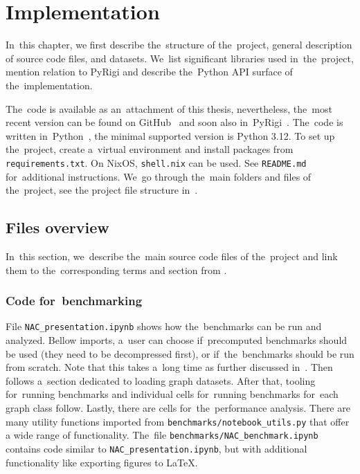 
\chapter{Implementation}%
\label{chapter:impl}

\begin{chapterabstract}

	In~this chapter,
	we first describe the~structure of the~project,
	general description of source code files, and datasets.
	We~list significant libraries used in~the~project,
	mention relation to PyRigi and
	describe the~Python API surface of the~implementation.

\end{chapterabstract}

The~code is available as an~attachment of this thesis,
nevertheless, the~most recent version can be found on GitHub~\cite{my_code}
and soon also in~PyRigi~\cite{pyrigi}.
%
The~code is written in~Python~\cite{python}, the minimal supported version is Python 3.12.
To set up the~project, create a~virtual environment and install packages
from \texttt{requirements.txt}. On NixOS, \texttt{shell.nix} can be used.
See \texttt{README.md} for~additional instructions.
We~go through the~main folders and files of the~project,
see the project file structure in~.


\section{Files overview}

In~this section, we~describe the~main source code files of the~project
and link them to the~corresponding terms and section
from .

\subsection{Code for~benchmarking}

File \texttt{NAC\_presentation.ipynb} shows how the~benchmarks
can be run and analyzed.
Bellow imports, a~user can choose if~precomputed benchmarks should be used
(they need to be decompressed first),
or if~the~benchmarks should be run from scratch.
Note that this takes a~long time
as further discussed in~.
Then follows a~section dedicated to loading graph datasets.
After that, tooling for~running benchmarks and individual cells
for~running benchmarks for~each graph class follow.
Lastly, there are cells for~the~performance analysis.
%
There are many utility functions
imported from \texttt{benchmarks/notebook\_utils.py}
that offer a wide range of functionality.
The~file \texttt{benchmarks/NAC\_benchmark.ipynb}
contains code similar to \texttt{NAC\_presentation.ipynb},
but with additional functionality like exporting figures to \LaTeX{}.

